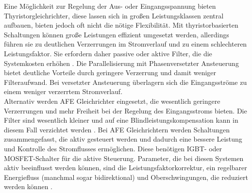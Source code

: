 		Eine Möglichkeit zur Regelung der Aus- oder Eingangsspannung bieten Thyristorgleichrichter, diese lassen sich in großen Leistungsklassen zentral aufbauen, bieten jedoch oft nicht die nötige Flexibilität. 
		Mit thyristorbasierten Schaltungen können große Leistungen effizient umgesetzt werden, allerdings führen sie zu deutlichen Verzerrungen im Stromverlauf und zu einem schlechteren Leistungsfaktor. Sie erfordern daher passive oder aktive Filter, die die Systemkosten erhöhen \cite{HydrogenElectronicTopologies}. Die Parallelisierung mit Phasenversetzter Ansteuerung bietet deutliche Vorteile durch geringere Verzerrung und damit weniger Filteraufwand. Bei versetzter Ansteuerung überlagern sich die Eingangsströme zu einem weniger verzerrtem Stromverlauf.\\
		Alternativ werden \gls{AFE} Gleichrichter eingesetzt, die wesentlich geringere Verzerrungen und mehr Freiheit bei der Regelung des Eingangsstroms bieten. Die Filter sind wesentlich kleiner und auf eine Blindleistungskompensation kann in diesem Fall verzichtet werden \cite{HydrogenElectronicTopologies}. Bei \gls{AFE} Gleichrichtern werden Schaltungen zusammengefasst, die aktiv gesteuert werden und dadurch eine bessere Leistung und Kontrolle des Stromflusses ermöglichen. Diese benötigen \gls{IGBT}- oder \gls{MOSFET}-Schalter für die aktive Steuerung. Parameter, die bei diesen Systemen aktiv beeinflusst werden können, sind die Leistungsfaktorkorrektur, ein regelbarer Energiefluss (manchmal sogar bidirektional) und Oberschwingungen, die reduziert werden können \cite{HydrogenElectronicTopologies}.
